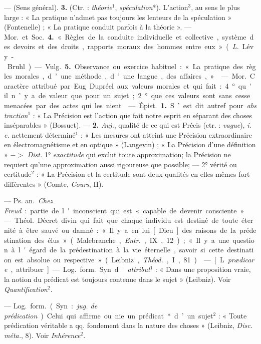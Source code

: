 \begin{itemize}[leftmargin=1cm, label=, itemsep=1pt]
 — (Sens général).  {\bf 3.} (Ctr. : {\it théorie}$^1$,
{\it spéculation}*). L'action$^3$, au sens le plus large : « La pratique
n’admet pas toujours les lenteurs de la spéculation » (Fontenelle) ; « La
pratique conduit parfois à la théorie ». — \si{Mor.} et \si{Soc.} {\bf 4.} «
Règles de la conduite individuelle et collective, système des devoirs et des
droits, rapports moraux des hommes entre eux » ({\it L.} Lévy-Bruhl). —
\si{Vulg.} {\bf 5.} Observance ou exercice habituel : « La pratique des
règles morales, d’une méthode, d’une langue, des affaires, »

 — \si{Mor.} Caractère attribué par Eug. Dupréel aux valeurs
morales et qui fait : 4° qu'il n’y a de valeur que pour un sujet ; 2° que ces
valeurs sont sans cesse menacées par des actes qui les nient.

 — \si{Épist.} {\bf 1.} S’est dit autref. pour
{\it abstraction}$^1$ : « La Précision est l’action que fait notre
esprit en séparant des choses inséparables » (Bossuet). — {\bf 2.}
{\it Auj.}, qualité de ce qui est Précis (ctr. : {\it vague}),
{\it i. e.} nettement déterminé$^1$ : « Les mesures ont atteint une Précision
extraordinaire en électromagnétisme et en optique » (Langevin) ; « La
Précision d'une définition » $->$ {\it Dist.} 1° {\it exactitude} qui exclut
toute approximation; la Précision ne requiert qu’une approximation aussi
rigoureuse que possible; — 2° vérité ou certitude$^2$ : « La  Précision et la
certitude sont deux qualités en elles-mêmes fort différentes » (Comte,
{\it Cours}, II).

 — \si{Ps. an.} {\it Chez Freud} : partie de l'inconscient
qui est « capable de devenir consciente ».

 — \si{Théol.} Décret divin qui fait que chaque individu
est destiné de toute éternité à être
sauvé ou damné : « Il y a en lui [Dieu] des raisons de la prédestination des
élus » (Malebranche, {\it Entr.}, IX, 12) ; « Il y a une question à l'égard
de la prédestination à la vie éternelle, savoir si cette destination est
absolue ou respective » (Leibniz, {\it Théod.}, I, 81).

 — [L. {\it prædicare}, attribuer] — \si{Log.} \si{form.} Syn.
d'{\it attribut}$^1$ : « Dans une proposition vraie, la notion du prédicat
est toujours contenue dans le sujet » (Leibniz). Voir
{\it Quantification}$^2$.

 — \si{Log.} \si{form.} (Syn. : {\it jug. de
prédication}). Celui qui affirme ou nie un prédicat* d’un sujet$^2$ : « Toute
prédication véritable a qq. fondement dans la nature des choses » (Leibniz,
{\it Disc. méta.}, 8). Voir {\it Inhérence}$^2$.


\end{itemize}
